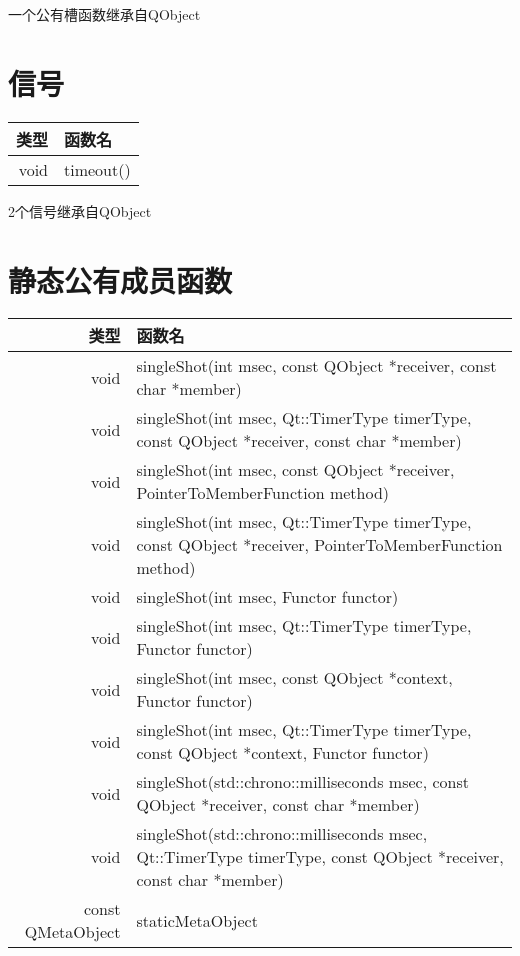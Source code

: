 \begin{compactitem}
\item 一个公有槽函数继承自QObject
\end{compactitem}

\section{信号}

\begin{tabular}{|r|l|}
	\hline
	类型	 & 函数名 \\
	\hline
void	 & timeout() \\
	\hline 
\end{tabular}

\begin{compactitem}
\item 2个信号继承自QObject
\end{compactitem}

\section{静态公有成员函数}

\begin{tabular}{|r|l|}
	\hline
	类型	 & 函数名 \\
	\hline
void	 & singleShot(int msec, const QObject *receiver, const char *member) \\
\hline
void &	singleShot(int msec, Qt::TimerType timerType, const QObject *receiver, const char *member) \\
\hline
void	 & singleShot(int msec, const QObject *receiver, PointerToMemberFunction method) \\
\hline
void	 & singleShot(int msec, Qt::TimerType timerType, const QObject *receiver, PointerToMemberFunction method) \\ 
\hline
void	 & singleShot(int msec, Functor functor) \\
\hline
void	 & singleShot(int msec, Qt::TimerType timerType, Functor functor) \\
\hline
void	 & singleShot(int msec, const QObject *context, Functor functor) \\
\hline
void	 & singleShot(int msec, Qt::TimerType timerType, const QObject *context, Functor functor) \\
\hline
void &	singleShot(std::chrono::milliseconds msec, const QObject *receiver, const char *member) \\
\hline
void	 & singleShot(std::chrono::milliseconds msec, Qt::TimerType timerType, const QObject *receiver, const char *member) \\
\hline
const QMetaObject	 & staticMetaObject \\
	\hline 
\end{tabular}


